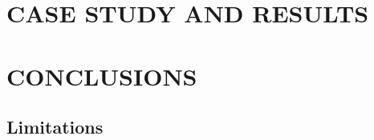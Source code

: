\documentclass[a4paper,twoside]{article}
\begin{document}




\section{CASE STUDY AND RESULTS}\label{CaseStudy}
\section{CONCLUSIONS}\label{Conclusion}
\subsection{Limitations}


%


\end{document}
